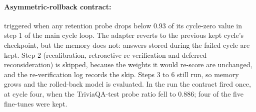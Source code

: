 \paragraph{Asymmetric-rollback contract:} triggered when any retention probe drops below $0.93$ of its cycle-zero value in step 1 of the main cycle loop. The adapter reverts to the previous kept cycle's checkpoint, but the memory does not: answers stored during the failed cycle are kept. Step 2 (recalibration, retroactive re-verification and deferred reconsideration) is skipped, because the weights it would re-score are unchanged, and the re-verification log records the skip. Steps 3 to 6 still run, so memory grows and the rolled-back model is evaluated. In the run the contract fired once, at cycle four, when the TriviaQA-test probe ratio fell to $0.886$; four of the five fine-tunes were kept.
